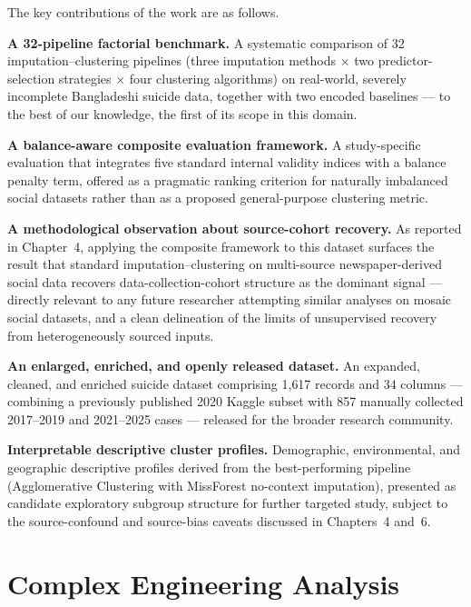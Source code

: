 The key contributions of the work are as follows.

\textbf{A 32-pipeline factorial benchmark.} A systematic comparison of 32 imputation--clustering pipelines (three imputation methods $\times$ two predictor-selection strategies $\times$ four clustering algorithms) on real-world, severely incomplete Bangladeshi suicide data, together with two encoded baselines --- to the best of our knowledge, the first of its scope in this domain.

\textbf{A balance-aware composite evaluation framework.} A study-specific evaluation that integrates five standard internal validity indices with a balance penalty term, offered as a pragmatic ranking criterion for naturally imbalanced social datasets rather than as a proposed general-purpose clustering metric.

\textbf{A methodological observation about source-cohort recovery.} As reported in Chapter~4, applying the composite framework to this dataset surfaces the result that standard imputation--clustering on multi-source newspaper-derived social data recovers data-collection-cohort structure as the dominant signal --- directly relevant to any future researcher attempting similar analyses on mosaic social datasets, and a clean delineation of the limits of unsupervised recovery from heterogeneously sourced inputs.

\textbf{An enlarged, enriched, and openly released dataset.} An expanded, cleaned, and enriched suicide dataset comprising 1{,}617 records and 34 columns --- combining a previously published 2020 Kaggle subset with 857 manually collected 2017--2019 and 2021--2025 cases --- released for the broader research community.

\textbf{Interpretable descriptive cluster profiles.} Demographic, environmental, and geographic descriptive profiles derived from the best-performing pipeline (Agglomerative Clustering with MissForest no-context imputation), presented as candidate exploratory subgroup structure for further targeted study, subject to the source-confound and source-bias caveats discussed in Chapters~4 and~6.

\section{Complex Engineering Analysis}

